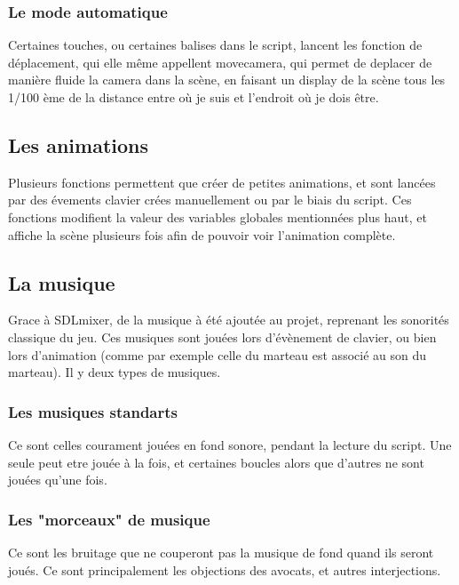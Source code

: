 	\subsubsection{Le mode automatique}
	Certaines touches, ou certaines balises dans le script, lancent les fonction de déplacement, qui elle même appellent movecamera, qui permet de deplacer de manière fluide la camera dans la scène, en faisant un display de la scène tous les 1/100 ème de la distance entre où je suis et l'endroit où je dois être.
\subsection{Les animations}
	Plusieurs fonctions permettent que créer de petites animations, et sont lancées par des évements clavier crées manuellement ou par le biais du script. Ces fonctions modifient la valeur des variables globales mentionnées plus haut, et affiche la scène plusieurs fois afin de pouvoir voir l'animation complète.
\subsection{La musique}
	Grace à SDLmixer, de la musique à été ajoutée au projet, reprenant les sonorités classique du jeu. Ces musiques sont jouées lors d'évènement de clavier, ou bien lors d'animation (comme par exemple celle du marteau est associé au son du marteau). Il y deux types de musiques.
	\subsubsection{Les musiques standarts}
	Ce sont celles courament jouées en fond sonore, pendant la lecture du script. Une seule peut etre jouée à la fois, et certaines boucles alors que d'autres ne sont jouées qu'une fois.
	\subsubsection{Les "morceaux" de musique}
	Ce sont les bruitage que ne couperont pas la musique de fond quand ils seront joués. Ce sont principalement les objections des avocats, et autres interjections.
	